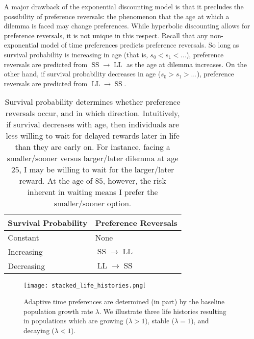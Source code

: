 \documentclass[titlepage, hidelinks, 12pt]{article}
\theoremstyle{plain}
\theoremstyle{remark}
\theoremstyle{definition}
\DeclareMathOperator{\smallersooner}{SS}
\DeclareMathOperator{\largerlater}{LL}
\begin{document}
A major drawback of the exponential discounting model is that it precludes the possibility of preference reversals: the phenomenon that the
age at which a dilemma is faced may change preferences. While hyperbolic discounting allows for preference reversals, it is not unique in 
this respect. Recall that any
non-exponential model of time preferences predicts preference reversals. 
So long as survival probability is increasing in age (that is, $s_0 < s_1 < \ldots$), preference reversals are predicted from $\smallersooner\to
\largerlater$ as the age at dilemma increases. On the other hand, if survival probability decreases in age ($s_0 > s_1 > \ldots$), preference reversals are 
predicted from $\largerlater\to\smallersooner$. 

\begin{table}[h]
    \centering
\begin{tabular}{|l|l|}
    \hline
Survival Probability & Preference Reversals            \\ \hline \hline
Constant             & None                            \\
Increasing           & $\smallersooner\to\largerlater$ \\
Decreasing           & $\largerlater\to\smallersooner$ \\ \hline
\end{tabular}
\caption{Survival probability determines whether preference reversals occur, and in which direction. Intuitively, if survival 
decreases with age, then individuals are less willing to wait for delayed rewards later in life than they are early on. For instance,
facing a smaller/sooner versus larger/later dilemma at age $25$, I may be willing to wait for the larger/later reward. At the age of
$85$, however, the risk inherent in waiting means I prefer the smaller/sooner option.}
\end{table}







\begin{figure}[H]
    \centering
    \texttt{[image: stacked\_life\_histories.png]}
    \caption{Adaptive time preferences are determined (in part) by the baseline population growth rate $\lambda$. 
        We illustrate three life histories resulting in populations which are
        growing ($\lambda > 1$), stable ($\lambda = 1$), and decaying ($\lambda < 1$).}
\end{figure}
\newpage
\end{document}
